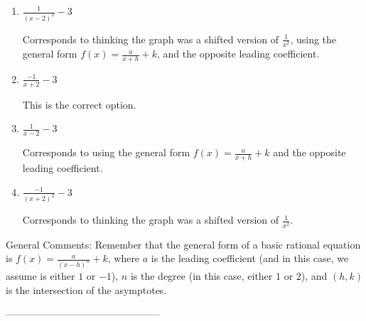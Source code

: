 \documentclass{article}[10pt]
\begin{document}
\begin{enumerate}[label=\Alph*.] 
\item $ \frac{1}{(x - 2)^2} - 3 $ 

 Corresponds to thinking the graph was a shifted version of $\frac{1}{x^2}$, using the general form $f(x) = \frac{a}{x+h}+k$, and the opposite leading coefficient. 
\item $ \frac{-1}{x + 2} - 3 $ 

 This is the correct option. 
\item $ \frac{1}{x - 2} - 3 $ 

 Corresponds to using the general form $f(x) = \frac{a}{x+h}+k$ and the opposite leading coefficient. 
\item $ \frac{-1}{(x + 2)^2} - 3 $ 

 Corresponds to thinking the graph was a shifted version of $\frac{1}{x^2}$. 
\end{enumerate} 
 
General Comments: Remember that the general form of a basic rational equation is $ f(x) = \frac{a}{(x-h)^n} + k$, where $a$ is the leading coefficient (and in this case, we assume is either $1$ or $-1$), $n$ is the degree (in this case, either $1$ or $2$), and $(h, k)$ is the intersection of the asymptotes.

-----------------------------------------------
\end{document}
